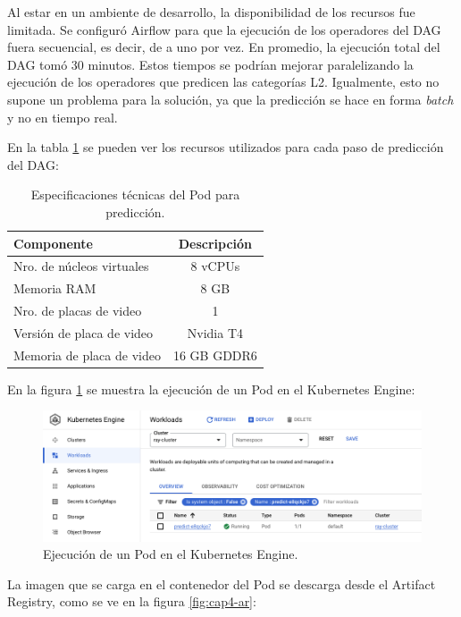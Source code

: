 Al estar en un ambiente de desarrollo, la disponibilidad de los recursos fue limitada. Se configuró Airflow para que la ejecución de los operadores del DAG fuera secuencial, es decir, de a uno por vez. En promedio, la ejecución total del DAG tomó 30 minutos. Estos tiempos se podrían mejorar paralelizando la ejecución de los operadores que predicen las categorías L2. Igualmente, esto no supone un problema para la solución, ya que la predicción se hace en forma \textit{batch} y no en tiempo real.

En la tabla \ref{tab:gke} se pueden ver los recursos utilizados para cada paso de predicción del DAG:
\begin{table}[h]
	\centering
	\caption[Especificaciones técnicas Pod]{Especificaciones técnicas del Pod para predicción.}
	\begin{tabular}{l c}    
		\toprule
		\textbf{Componente}			& 			\textbf{Descripción}  \\
		\midrule	
		Nro. de núcleos virtuales	& 			8 vCPUs  \\
		Memoria RAM					&			8 GB \\
		Nro. de placas de video 	& 			1  \\
		Versión de placa de video	&			Nvidia T4 \\
		Memoria de placa de video	& 			16 GB GDDR6  \\
		\bottomrule
		\hline
	\end{tabular}
	\label{tab:gke}
\end{table}

En la figura \ref{fig:cap4-pod} se muestra la ejecución de un Pod en el Kubernetes Engine:

\begin{figure}[htbp]
	\centering
	\includegraphics[width=1\textwidth]{./Figures/cap4-pod.png}
	\caption{Ejecución de un Pod en el Kubernetes Engine.}
	\label{fig:cap4-pod}
\end{figure}

La imagen que se carga en el contenedor del Pod se descarga desde el Artifact Registry, como se ve en la figura \ref{fig:cap4-ar}:


